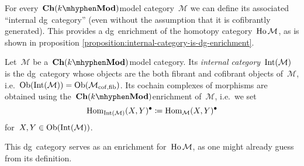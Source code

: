 For every~$\Ch(k\mhyphen\Mod)$\dash model category~$\mathcal{M}$ we can define its associated ``internal dg~category'' (even without the assumption that it is cofibrantly generated). This provides a dg~enrichment of the homotopy category~$\mathrm{Ho} \,\mathcal{M}$, as is shown in proposition \ref{proposition:internal-category-is-dg-enrichment}.
\begin{definition}
  Let~$\mathcal{M}$ be a~$\Ch(k\mhyphen\Mod)$\dash model category. Its \emph{internal category}~$\operatorname{Int}(\mathcal{M})$ is the dg~category whose objects are the both fibrant and cofibrant objects of~$\mathcal{M}$, i.e.\ $\mathrm{Ob}(\operatorname{Int}(\mathcal{M}))=\mathrm{Ob}(\mathcal{M}_{\mathrm{cof},\mathrm{fib}})$. Its cochain complexes of morphisms are obtained using the~$\Ch(k\mhyphen\Mod)$\dash enrichment of~$\mathcal{M}$, i.e.\ we set
  \begin{equation}
    \mathrm{Hom}_{\operatorname{Int}(\mathcal{M})}(X,Y)^\bullet\coloneqq\mathrm{Hom}_{\mathcal{M}}(X,Y)^\bullet
  \end{equation}
  for~$X,Y\in\mathrm{Ob}(\operatorname{Int}(\mathcal{M}))$.
\end{definition}
This dg~category serves as an enrichment for~$\mathrm{Ho} \,\mathcal{M}$, as one might already guess from its definition.
